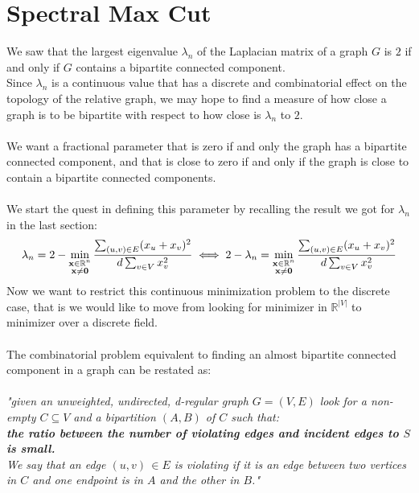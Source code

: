 \section{Spectral Max Cut}
We saw that the largest eigenvalue $ \lambda_n $ of the Laplacian matrix of a graph $ G $ is $ 2 $ if and only if $ G $ contains a bipartite connected component. \\
Since $ \lambda_n $ is a continuous value that has a discrete and combinatorial effect on the topology of the relative graph, we may hope to find a measure of how close a graph is to be bipartite with respect to how close is $ \lambda_n $ to $ 2 $. 
\\
\\
We want a fractional parameter that is zero
if and only
the graph has a bipartite connected component, 
and that is close to zero if and only if the graph is
close to contain a bipartite connected components. 
\\
\\
We start the quest in defining this parameter by recalling the result we got for $ \lambda_n $ in the last section:
\[
\lambda_n = 2 - \min_{\substack{\mathbf{x} \in \mathbb{R}^n \\ \mathbf{x} \ne \mathbf{0}}} \frac{\sum_{(u,v)\in E}(x_u+x_v)^2}{d \sum_{v \in V} x_v^2 } \\
\iff 
2-\lambda_n = \min_{\substack{\mathbf{x} \in \mathbb{R}^n \\ \mathbf{x} \ne \mathbf{0}}} \frac{\sum_{(u,v)\in E}(x_u+x_v)^2}{d \sum_{v \in V} x_v^2 }  \]
Now we want to restrict this continuous minimization problem to the discrete case, that is we would like to move from looking for minimizer in $ \mathbb{R}^{|V|} $ to minimizer over a discrete field. 
\\
\\
The combinatorial problem equivalent to finding an almost bipartite connected component in a graph can be restated as: \\ \\
\emph{"given an unweighted, undirected, d-regular graph $ G = (V,E) $ look for a non-empty $ C \subseteq V $ and a bipartition $ (A,B) $ of $ C $ such that:
\\
\textbf{the ratio between the number of violating edges and incident edges to $ S $ is small.}
\\
We say that an edge $ (u,v)\, \in E $ is violating if it is an edge between two vertices in $ C $ and one endpoint is in $ A $ and the other in $ B $."}
